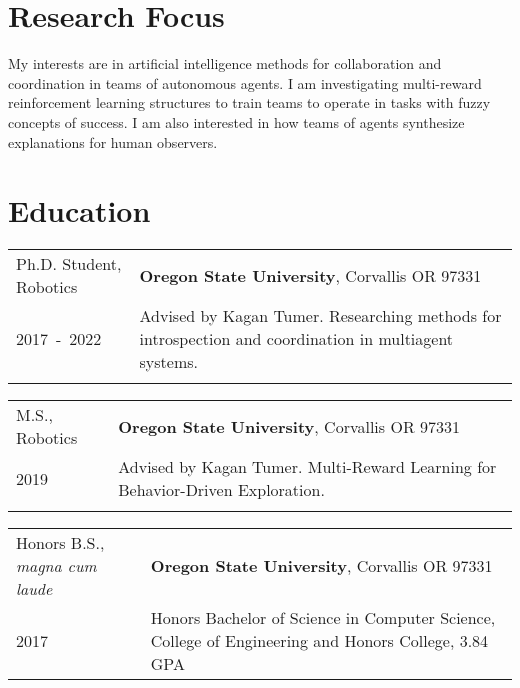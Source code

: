 \documentclass[letterpaper,10pt,titlepage]{article}
\newcommand{\leftW}{0.32\textwidth}
\begin{document}
\pagestyle{empty}%
\par{\par}

\section*{Research Focus}
My interests are in artificial intelligence methods for collaboration and coordination in teams of autonomous agents. I am investigating multi-reward reinforcement learning structures to train teams to operate in tasks with fuzzy concepts of success. 
I am also interested in how teams of agents synthesize explanations for human observers.

\section*{Education}
\begin{tabularx}{\textwidth}{p{\leftW}X}
	Ph.D. Student, Robotics & \textbf{Oregon State University}, Corvallis OR 97331\\

	\mbox{2017 - 2022} & Advised by Kagan Tumer. Researching methods for introspection and coordination in multiagent systems.\\
	 &\\
\end{tabularx}
\begin{tabularx}{\textwidth}{p{\leftW}X}
	M.S., Robotics & \textbf{Oregon State University}, Corvallis OR 97331\\
	
	\mbox{2019} & Advised by Kagan Tumer. Multi-Reward Learning for Behavior-Driven Exploration.\\
	&\\
\end{tabularx}
\begin{tabularx}{\textwidth}{p{\leftW}X}
	Honors B.S., \textit{magna cum laude} & \textbf{Oregon State University}, Corvallis OR 97331\\
	2017 & Honors Bachelor of Science in Computer Science, College of Engineering and Honors College, 3.84 GPA \\
\end{tabularx}
\end{document}
